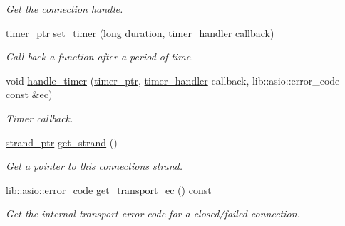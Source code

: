 \begin{DoxyCompactItemize}
\begin{DoxyCompactList}\small\item\em Get the connection handle. \end{DoxyCompactList}\item 
\mbox{\hyperlink{classwebsocketpp_1_1transport_1_1asio_1_1connection_a96d8a6cd5cf1120208b206da109a194e}{timer\+\_\+ptr}} \mbox{\hyperlink{classwebsocketpp_1_1transport_1_1asio_1_1connection_ab9db04550ee6b3dd2643cd7d23cda3f1}{set\+\_\+timer}} (long duration, \mbox{\hyperlink{namespacewebsocketpp_1_1transport_a946cc56ff41139f3002149c15fd87bc9}{timer\+\_\+handler}} callback)
\begin{DoxyCompactList}\small\item\em Call back a function after a period of time. \end{DoxyCompactList}\item 
void \mbox{\hyperlink{classwebsocketpp_1_1transport_1_1asio_1_1connection_a61ec4db64a17fcd38d2ca1c819dd2d9b}{handle\+\_\+timer}} (\mbox{\hyperlink{classwebsocketpp_1_1transport_1_1asio_1_1connection_a96d8a6cd5cf1120208b206da109a194e}{timer\+\_\+ptr}}, \mbox{\hyperlink{namespacewebsocketpp_1_1transport_a946cc56ff41139f3002149c15fd87bc9}{timer\+\_\+handler}} callback, lib\+::asio\+::error\+\_\+code const \&ec)
\begin{DoxyCompactList}\small\item\em Timer callback. \end{DoxyCompactList}\item 
\mbox{\label{classwebsocketpp_1_1transport_1_1asio_1_1connection_a1d636545ad5cc7d78ddcff414fd55d0a}} 
\mbox{\hyperlink{classwebsocketpp_1_1transport_1_1asio_1_1connection_ad960008bc6449e5c74e041d21a5c05e4}{strand\+\_\+ptr}} \mbox{\hyperlink{classwebsocketpp_1_1transport_1_1asio_1_1connection_a1d636545ad5cc7d78ddcff414fd55d0a}{get\+\_\+strand}} ()
\begin{DoxyCompactList}\small\item\em Get a pointer to this connection\textquotesingle{}s strand. \end{DoxyCompactList}\item 
lib\+::asio\+::error\+\_\+code \mbox{\hyperlink{classwebsocketpp_1_1transport_1_1asio_1_1connection_a8394f160cb79d081ff5d10d355bacf1a}{get\+\_\+transport\+\_\+ec}} () const
\begin{DoxyCompactList}\small\item\em Get the internal transport error code for a closed/failed connection. \end{DoxyCompactList}\end{DoxyCompactItemize}
